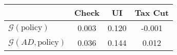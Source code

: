 \begin{tabular}{@{}lccc@{}} 
\toprule 
                          & Check      & UI    & Tax Cut    \\  \midrule 
$\mathcal{G}(\text{policy})$ & 0.003  & 0.120  & -0.001     \\ 
$\mathcal{G}(AD,\text{policy})$ & 0.036  & 0.144  & 0.012     \\ 
\end{tabular}  
